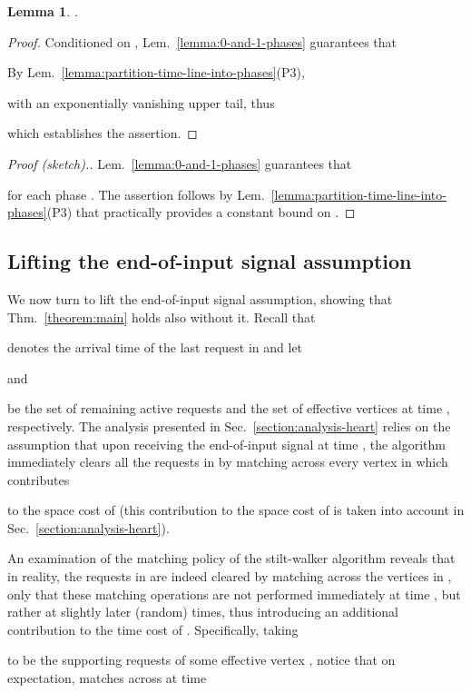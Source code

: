 \documentclass[11pt]{article}
\def\LongVersion{}
\def\LongVersionEnd{}
\def\ShortVersion{}
\def\ShortVersionEnd{}
\newtheorem{lemma}[theorem]{Lemma}
\theoremstyle{definition}
\theoremstyle{plain}
\newtheorem{lemma}[theorem]{Lemma}
\theoremstyle{definition}
\theoremstyle{plain}
\newtheorem{lemma}{Lemma}[section]
\theoremstyle{definition}
\theoremstyle{plain}
\newcommand{\Sect}{Sec.}
\newcommand{\Thm}{Thm.}
\newcommand{\Lem}{Lem.}
\begin{document}
\begin{lemma} \label{lemma:bound-late-phases}
.
\end{lemma}
\LongVersion \begin{proof}
Conditioned on ,
\Lem{}~\ref{lemma:0-and-1-phases} guarantees that

By \Lem{}~\ref{lemma:partition-time-line-into-phases}(P3),

with an exponentially vanishing upper tail, thus

which establishes the assertion.
\end{proof}
\LongVersionEnd \ShortVersion \begin{proof}[Proof (sketch).]
\Lem{}~\ref{lemma:0-and-1-phases} guarantees that 

for each phase .
The assertion follows by
\Lem{}~\ref{lemma:partition-time-line-into-phases}(P3) that practically
provides a constant bound on
.
\end{proof}
\ShortVersionEnd 

\LongVersion \subsection{Lifting the end-of-input signal assumption}
\label{section:lift-end-of-input-assumption}
We now turn to lift the end-of-input signal assumption, showing that
\Thm{}~\ref{theorem:main} holds also without it.
Recall that

denotes the arrival time of the last request in  and let

and

be the set of remaining active requests and the set of effective vertices at
time , respectively.
The analysis presented in \Sect{}~\ref{section:analysis-heart} relies on the
assumption that upon receiving the end-of-input signal at time , the
algorithm immediately clears all the requests in  by matching across every
vertex in  which contributes

to the space cost of  (this contribution to the space cost of  is
taken into account in \Sect{}~\ref{section:analysis-heart}).

An examination of the matching policy of the stilt-walker algorithm reveals
that in reality, the requests in  are indeed cleared by matching across the
vertices in , only that these matching operations are not performed
immediately at time , but rather at slightly later (random) times,
thus introducing an additional contribution to the time cost of .
Specifically, taking

to be the supporting requests of some effective vertex
,
notice that on expectation,  matches across  at time
\end{document}
